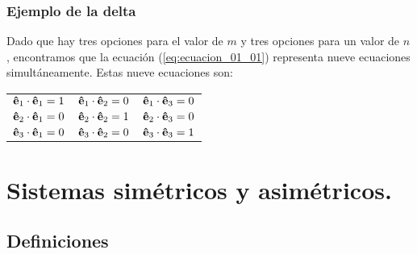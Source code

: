 \documentclass[12pt]{beamer}
\begin{document}
\begin{frame}
\frametitle{Ejemplo de la delta}
Dado que hay tres opciones para el valor de $m$ y tres opciones para un valor de $n$, encontramos que la ecuación (\ref{eq:ecuacion_01_01}) representa nueve ecuaciones simultáneamente. \pause Estas nueve ecuaciones son:
\begin{table}[H]
\large
\centering
\begin{tabular}{c c c}
$\vu{e}_{1} \cdot \vu{e}_{1} = 1$ & $\vu{e}_{1} \cdot \vu{e}_{2} = 0$ & $\vu{e}_{1} \cdot \vu{e}_{3} = 0$ \\
$\vu{e}_{2} \cdot \vu{e}_{1} = 0$ & $\vu{e}_{2} \cdot \vu{e}_{2} = 1$ & $\vu{e}_{2} \cdot \vu{e}_{3} = 0$ \\
$\vu{e}_{3} \cdot \vu{e}_{1} = 0$ & $\vu{e}_{3} \cdot \vu{e}_{2} = 0$ & $\vu{e}_{3} \cdot \vu{e}_{3} = 1$
\end{tabular}
\end{table}
\end{frame}

\section{Sistemas simétricos y asimétricos.}
\subsection{Definiciones}
\end{document}
